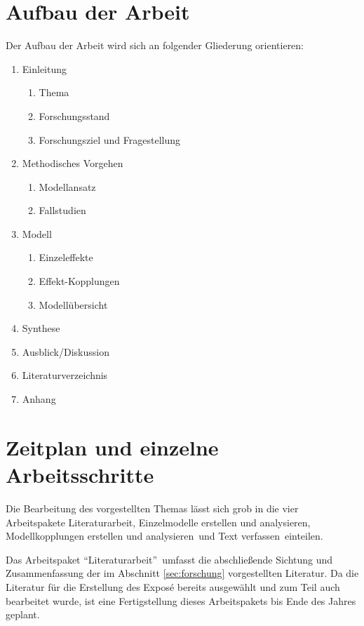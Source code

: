 \documentclass[11pt, titlepage=true]{scrartcl} %
\begin{document}
\section{Aufbau der Arbeit}
Der Aufbau der Arbeit wird sich an folgender Gliederung orientieren:

\begin{enumerate}
\item Einleitung
	\begin{enumerate}
		\item Thema
		\item Forschungsstand
		\item Forschungsziel und Fragestellung
	\end{enumerate}
\item Methodisches Vorgehen
	\begin{enumerate}
		\item Modellansatz
		\item Fallstudien
	\end{enumerate}
\item Modell
	\begin{enumerate}
		\item Einzeleffekte
		\item Effekt-Kopplungen
		\item Modellübersicht
	\end{enumerate}

\item Synthese
\item Ausblick/Diskussion
\item Literaturverzeichnis
\item Anhang
\end{enumerate}

\section{Zeitplan und einzelne Arbeitsschritte}
\newcommand{\paketEins}{Literaturarbeit}
\newcommand{\paketZwei}{Einzelmodelle erstellen und analysieren}
\newcommand{\paketDrei}{Modellkopplungen erstellen und analysieren}
\newcommand{\paketVier}{Text verfassen}
Die Bearbeitung des vorgestellten Themas lässt sich grob in die vier
Arbeitspakete \paketEins, \paketZwei, \paketDrei\ und \paketVier\ einteilen. 

Das Arbeitspaket \enquote{\paketEins}\ umfasst die abschließende Sichtung und
Zusammenfassung der im Abschnitt \ref{sec:forschung} vorgestellten Literatur. Da
die Literatur für die Erstellung des Exposé bereits ausgewählt und zum Teil
auch bearbeitet wurde, ist eine Fertigstellung dieses Arbeitspakets bis Ende des
Jahres geplant.
\end{document}
